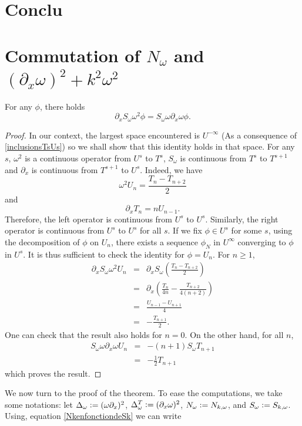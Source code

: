 \documentclass[a4paper]{article}
\begin{document}
\section{Conclu} 
	
\appendix
\section{Commutation of $N_\omega$ and $(\partial_x \omega)^2 + k^2\omega^2$}
\label{ann:commut}
\begin{Lem}
	\label{dxSomega2=Somegadxomega}
	For any $\phi$, there holds 
	\[\partial_x S_\omega \omega^2 \phi = S_\omega \omega \partial_x \omega \phi.\]
\end{Lem}
\begin{proof}
	In our context, the largest space encountered is $U^{- \infty}$ (As a consequence of \autoref{inclusionsTsUs}) so we shall show that this identity holds in that space.
	For any $s$, $\omega^2$ is a continuous operator from $U^s$ to $T^s$, $S_\omega$ is continuous from $T^s$ to $T^{s+1}$ and $\partial_x$ is continuous from $T^{s+1}$ to $U^s$. Indeed, we have 
	\[\omega^2 U_n = \frac{T_n - T_{n+2}}{2}\] 
	and 
	\[\partial_x T_n = n U_{n-1}.\]
	Therefore, the left operator is continuous from $U^s$ to $U^s$. Similarly, the right operator is continuous from $U^{s}$ to $U^s$ for all $s$. If we fix $\phi \in U^{s}$ for some $s$, using the decomposition of $\phi$ on $U_n$, there exists a sequence $\phi_N$ in $U^{\infty}$ converging to $\phi$ in $U^{s}$. It is thus sufficient to check the identity for $\phi = U_n$. For $n \geq 1$, 
	\begin{eqnarray*}
		\partial_x S_\omega \omega^2 U_n &=& \partial_x S_\omega \left(\frac{T_{n} - T_{n+2}}{2}\right)\\
		&=& \partial_x\left(\frac{T_{n}}{4n} - \frac{T_{n+2}}{4(n+2)} \right)\\
		&=& \frac{U_{n-1} - U_{n+1}}{4}\\
		&=& -\frac{T_{n+1}}{2}.
	\end{eqnarray*}
	One can check that the result also holds for $n = 0$. On the other hand, for all $n$, 
	\begin{eqnarray*}
		S_\omega \omega \partial_x \omega U_n &=&-(n+1) S_\omega T_{n+1}\\
		&=& -\frac{1}{2}T_{n+1}
	\end{eqnarray*}
	which proves the result. 
\end{proof}
We now turn to the proof of the theorem. To ease the computations, we take some notations: let $\Delta_\omega \mathrel{\mathop:}= (\omega \partial_x)^2$, $\Delta_\omega^T \mathrel{\mathop:}= (\partial_x \omega)^2$,  $N_\omega \mathrel{\mathop:}= N_{k,\omega}$, and $S_\omega \mathrel{\mathop:}= S_{k,\omega}$. Using, equation \eqref{NkenfonctiondeSk} we can write 
\end{document}

